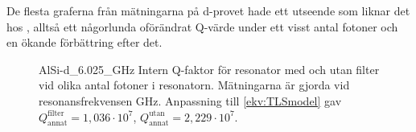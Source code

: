 \documentclass[main.tex]{subfiles}
\begin{document}
De flesta graferna från mätningarna på d-provet hade ett utseende som liknar det hos , alltså ett någorlunda oförändrat Q-värde under ett visst antal fotoner och en ökande förbättring efter det.

\begin{figure}[H]
  \centering
  \setlength{}
  \setlength\figureheight{15em}
  
  \caption{AlSi-d\_6.025\_GHz Intern Q-faktor för resonator med och utan filter vid olika antal fotoner i resonatorn. Mätningarna är gjorda vid resonansfrekvensen \unit[6,025]{GHz}. Anpassning till \ref{ekv:TLSmodel} gav $Q_{\text{annat}}^{\text{filter}}=1,036\cdot10^7$, $Q_{\text{annat}}^{\text{utan}}=2,229\cdot10^7$.}
  \label{fig:d6.025}
\end{figure}
\end{document}

